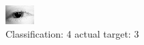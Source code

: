 \begin{figure}[h!]
\begin{center}
\includegraphics[width=0.60\columnwidth]{figures/ID26_class_4_target_3.png}
\end{center}
\caption{ Classification: 4 actual target: 3}
\label{fig:ID26_class_4_target_3}
\end{figure}
